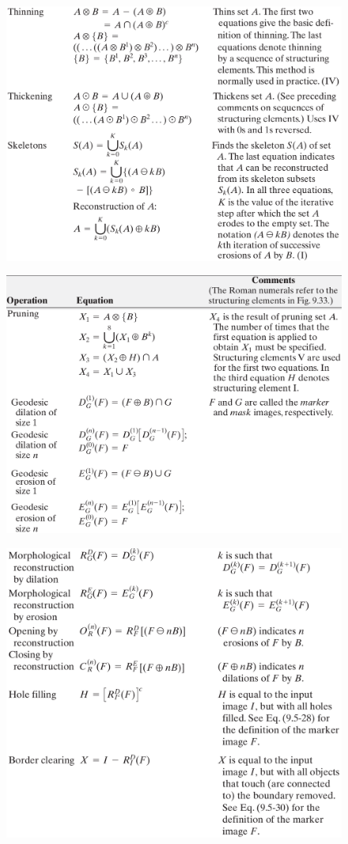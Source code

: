 \begin{frame}
\begin{figure}[!h]
\includegraphics[width=.8\textwidth]{table-9-1-2}
\end{figure}
\end{frame}

\begin{frame}
\begin{figure}[!h]
\includegraphics[width=.7\textwidth]{table-9-1-3}
\end{figure}
\end{frame}


\begin{frame}
\begin{figure}[!h]
\includegraphics[width=.7\textwidth]{table-9-1-4}
\end{figure}
\end{frame}

